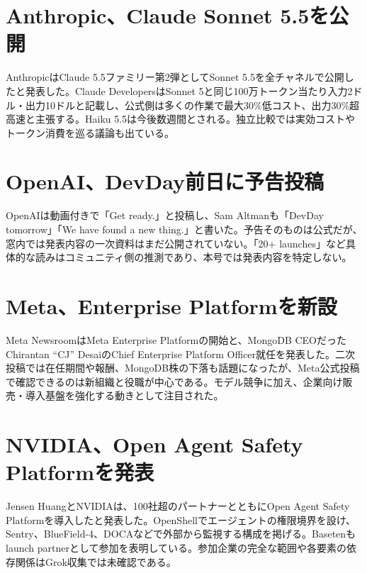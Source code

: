 \section{Anthropic、Claude Sonnet 5.5を公開}
AnthropicはClaude 5.5ファミリー第2弾としてSonnet 5.5を全チャネルで公開したと発表した。Claude DevelopersはSonnet 5と同じ100万トークン当たり入力2ドル・出力10ドルと記載し、公式側は多くの作業で最大30\%低コスト、出力30\%超高速と主張する。Haiku 5.5は今後数週間とされる。独立比較では実効コストやトークン消費を巡る議論も出ている。

\section{OpenAI、DevDay前日に予告投稿}
OpenAIは動画付きで「Get ready.」と投稿し、Sam Altmanも「DevDay tomorrow」「We have found a new thing.」と書いた。予告そのものは公式だが、窓内では発表内容の一次資料はまだ公開されていない。「20+ launches」など具体的な読みはコミュニティ側の推測であり、本号では発表内容を特定しない。

\section{Meta、Enterprise Platformを新設}
Meta NewsroomはMeta Enterprise Platformの開始と、MongoDB CEOだったChirantan ``CJ'' DesaiのChief Enterprise Platform Officer就任を発表した。二次投稿では在任期間や報酬、MongoDB株の下落も話題になったが、Meta公式投稿で確認できるのは新組織と役職が中心である。モデル競争に加え、企業向け販売・導入基盤を強化する動きとして注目された。

\section{NVIDIA、Open Agent Safety Platformを発表}
Jensen HuangとNVIDIAは、100社超のパートナーとともにOpen Agent Safety Platformを導入したと発表した。OpenShellでエージェントの権限境界を設け、Sentry、BlueField-4、DOCAなどで外部から監視する構成を掲げる。Basetenもlaunch partnerとして参加を表明している。参加企業の完全な範囲や各要素の依存関係はGrok収集では未確認である。


